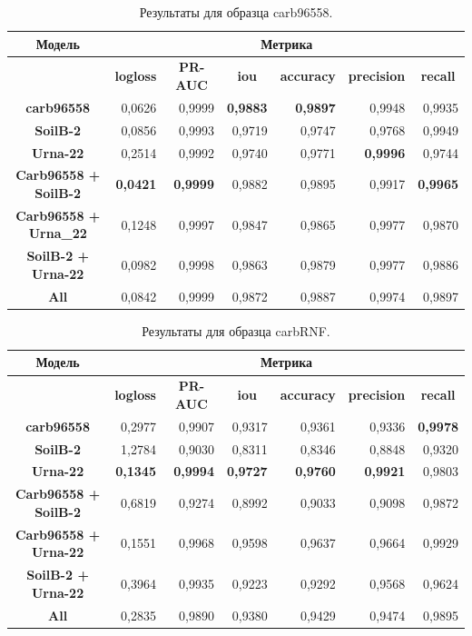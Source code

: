 \documentclass[12pt, a4paper]{extarticle}
\begin{document}
\begin{table}[htbp]
\small
\begin{tabular}{|c|r|r|r|r|r|r|}
\hline
\textbf{Модель} & \multicolumn{ 6}{c|}{\textbf{Метрика}} \\ \hline
\textbf{} & \multicolumn{1}{c|}{\textbf{logloss}} & \multicolumn{1}{c|}{\textbf{PR-AUC}} & \multicolumn{1}{c|}{\textbf{iou}} & \multicolumn{1}{c|}{\textbf{accuracy}} & \multicolumn{1}{c|}{\textbf{precision}} & \multicolumn{1}{c|}{\textbf{recall}} \\ \hline
\textbf{carb96558} & 0,0626 & 0,9999 & \textbf{0,9883} & \textbf{0,9897} & 0,9948 & 0,9935 \\ \hline
\textbf{SoilB-2} & 0,0856 & 0,9993 & 0,9719 & 0,9747 & 0,9768 & 0,9949 \\ \hline
\textbf{Urna-22} & 0,2514 & 0,9992 & 0,9740 & 0,9771 & \textbf{0,9996} & 0,9744 \\ \hline
\textbf{Carb96558 + SoilB-2} & \textbf{0,0421} & \textbf{0,9999} & 0,9882 & 0,9895 & 0,9917 & \textbf{0,9965} \\ \hline
\textbf{Carb96558 + Urna\_22} & 0,1248 & 0,9997 & 0,9847 & 0,9865 & 0,9977 & 0,9870 \\ \hline
\textbf{SoilB-2 + Urna-22} & 0,0982 & 0,9998 & 0,9863 & 0,9879 & 0,9977 & 0,9886 \\ \hline
\textbf{All} & 0,0842 & 0,9999 & 0,9872 & 0,9887 & 0,9974 & 0,9897 \\ \hline
\end{tabular}
\caption{Результаты для образца carb96558.}
\label{carb96558}
\end{table}


\begin{table}[htbp]
\small
\begin{tabular}{|c|r|r|r|r|r|r|}
\hline
\textbf{Модель} & \multicolumn{ 6}{c|}{\textbf{Метрика}} \\ \hline
\textbf{} & \multicolumn{1}{c|}{\textbf{logloss}} & \multicolumn{1}{c|}{\textbf{PR-AUC}} & \multicolumn{1}{c|}{\textbf{iou}} & \multicolumn{1}{c|}{\textbf{accuracy}} & \multicolumn{1}{c|}{\textbf{precision}} & \multicolumn{1}{c|}{\textbf{recall}} \\ \hline
\textbf{carb96558} & 0,2977 & 0,9907 & 0,9317 & 0,9361 & 0,9336 & \textbf{0,9978} \\ \hline
\textbf{SoilB-2} & 1,2784 & 0,9030 & 0,8311 & 0,8346 & 0,8848 & 0,9320 \\ \hline
\textbf{Urna-22} & \textbf{0,1345} & \textbf{0,9994} & \textbf{0,9727} & \textbf{0,9760} & \textbf{0,9921} & 0,9803 \\ \hline
\textbf{Carb96558 + SoilB-2} & 0,6819 & 0,9274 & 0,8992 & 0,9033 & 0,9098 & 0,9872 \\ \hline
\textbf{Carb96558 + Urna-22} & 0,1551 & 0,9968 & 0,9598 & 0,9637 & 0,9664 & 0,9929 \\ \hline
\textbf{SoilB-2 + Urna-22} & 0,3964 & 0,9935 & 0,9223 & 0,9292 & 0,9568 & 0,9624 \\ \hline
\textbf{All} & 0,2835 & 0,9890 & 0,9380 & 0,9429 & 0,9474 & 0,9895 \\ \hline
\end{tabular}
\caption{Результаты для образца carbRNF.}
\label{carbRNF}
\end{table}
\end{document}
